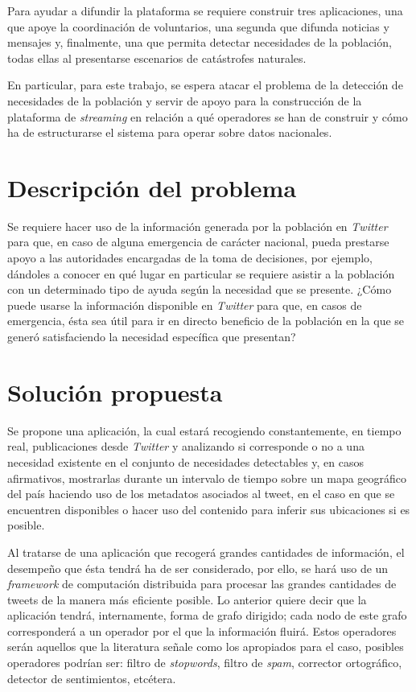 Para ayudar a difundir la plataforma se requiere construir tres aplicaciones, una que apoye la coordinación de voluntarios, una segunda que difunda noticias y mensajes y, finalmente, una que permita detectar necesidades de la población, todas ellas al presentarse escenarios de catástrofes naturales.

En particular, para este trabajo, se espera atacar el problema de la detección de necesidades de la población y servir de apoyo para la construcción de la plataforma de \textit{streaming} en relación a qué operadores se han de construir y cómo ha de estructurarse el sistema para operar sobre datos nacionales.

\section{Descripción del problema}
\label{intro:problema}

Se requiere hacer uso de la información generada por la población en \textit{Twitter} para que, en caso de alguna emergencia de carácter nacional, pueda prestarse apoyo a las autoridades encargadas de la toma de decisiones, por ejemplo, dándoles a conocer en qué lugar en particular se requiere asistir a la población con un determinado tipo de ayuda según la necesidad que se presente. ¿Cómo puede usarse la información disponible en \textit{Twitter} para que, en casos de emergencia, ésta sea útil para ir en directo beneficio de la población en la que se generó satisfaciendo la necesidad específica que presentan?

\section{Solución propuesta}
\label{intro:solucion}

Se propone una aplicación, la cual estará recogiendo constantemente, en tiempo real, publicaciones desde \textit{Twitter} y analizando si corresponde o no a una necesidad existente en el conjunto de necesidades detectables y, en casos afirmativos, mostrarlas durante un intervalo de tiempo sobre un mapa geográfico del país haciendo uso de los metadatos asociados al tweet, en el caso en que se encuentren disponibles o hacer uso del contenido para inferir sus ubicaciones si es posible.

Al tratarse de una aplicación que recogerá grandes cantidades de información, el desempeño que ésta tendrá ha de ser considerado, por ello, se hará uso de un \textit{framework} de computación distribuida para procesar las grandes cantidades de tweets de la manera más eficiente posible. Lo anterior quiere decir que la aplicación tendrá, internamente, forma de grafo dirigido; cada nodo de este grafo corresponderá a un operador por el que la información fluirá. Estos operadores serán aquellos que la literatura señale como los apropiados para el caso, posibles operadores podrían ser: filtro de \textit{stopwords}, filtro de \textit{spam}, corrector ortográfico, detector de sentimientos, etcétera.

